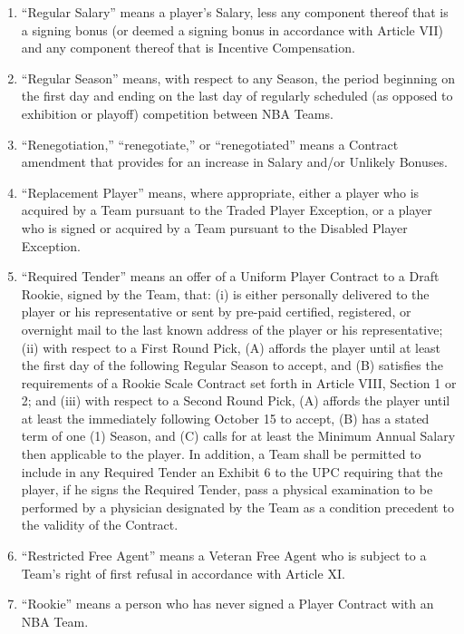 \documentclass[
]{book}
\begin{document}
\begin{enumerate}
\item
  ``Regular Salary'' means a player's Salary, less any component thereof that is a signing bonus (or deemed a signing bonus in accordance with Article VII) and any component thereof that is Incentive Compensation.
\item
  ``Regular Season'' means, with respect to any Season, the period beginning on the first day and ending on the last day of regularly scheduled (as opposed to exhibition or playoff) competition between NBA Teams.
\item
  ``Renegotiation,'' ``renegotiate,'' or ``renegotiated'' means a Contract amendment that provides for an increase in Salary and/or Unlikely Bonuses.
\item
  ``Replacement Player'' means, where appropriate, either a player who is acquired by a Team pursuant to the Traded Player Exception, or a player who is signed or acquired by a Team pursuant to the Disabled Player Exception.
\item
  ``Required Tender'' means an offer of a Uniform Player Contract to a Draft Rookie, signed by the Team, that: (i) is either personally delivered to the player or his representative or sent by pre-paid certified, registered, or overnight mail to the last known address of the player or his representative; (ii) with respect to a First Round Pick, (A) affords the player until at least the first day of the following Regular Season to accept, and (B) satisfies the requirements of a Rookie Scale Contract set forth in Article VIII, Section 1 or 2; and (iii) with respect to a Second Round Pick, (A) affords the player until at least the immediately following October 15 to accept, (B) has a stated term of one (1) Season, and (C) calls for at least the Minimum Annual Salary then applicable to the player. In addition, a Team shall be permitted to include in any Required Tender an Exhibit 6 to the UPC requiring that the player, if he signs the Required Tender, pass a physical examination to be performed by a physician designated by the Team as a condition precedent to the validity of the Contract.
\item
  ``Restricted Free Agent'' means a Veteran Free Agent who is subject to a Team's right of first refusal in accordance with Article XI.
\item
  ``Rookie'' means a person who has never signed a Player Contract with an NBA Team.


\end{enumerate}
\end{document}
